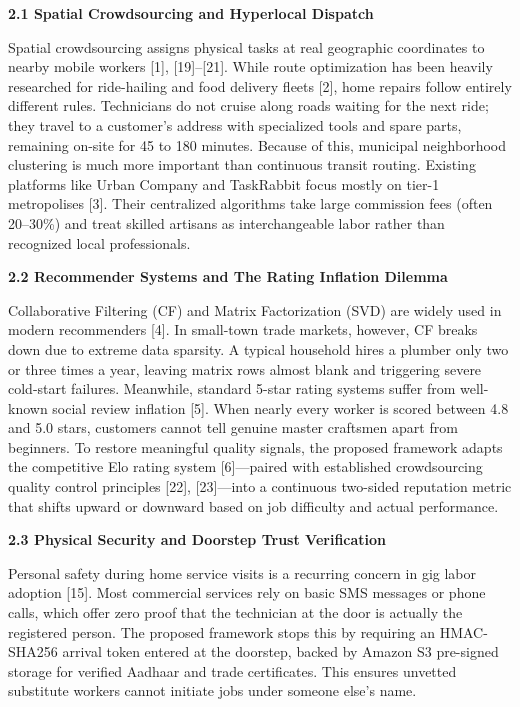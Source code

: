 \documentclass[10pt,twocolumn,a4paper]{article}
\begin{document}
\vspace{0.5em}
\noindent
\textbf{2.1 Spatial Crowdsourcing and Hyperlocal Dispatch}

Spatial crowdsourcing assigns physical tasks at real geographic coordinates to nearby mobile workers [1], [19]--[21]. While route optimization has been heavily researched for ride-hailing and food delivery fleets [2], home repairs follow entirely different rules. Technicians do not cruise along roads waiting for the next ride; they travel to a customer's address with specialized tools and spare parts, remaining on-site for 45 to 180 minutes. Because of this, municipal neighborhood clustering is much more important than continuous transit routing. Existing platforms like Urban Company and TaskRabbit focus mostly on tier-1 metropolises [3]. Their centralized algorithms take large commission fees (often 20--30\%) and treat skilled artisans as interchangeable labor rather than recognized local professionals.

\vspace{0.8em}
\noindent
\textbf{2.2 Recommender Systems and The Rating Inflation Dilemma}

Collaborative Filtering (CF) and Matrix Factorization (SVD) are widely used in modern recommenders [4]. In small-town trade markets, however, CF breaks down due to extreme data sparsity. A typical household hires a plumber only two or three times a year, leaving matrix rows almost blank and triggering severe cold-start failures. Meanwhile, standard 5-star rating systems suffer from well-known social review inflation [5]. When nearly every worker is scored between 4.8 and 5.0 stars, customers cannot tell genuine master craftsmen apart from beginners. To restore meaningful quality signals, the proposed framework adapts the competitive Elo rating system [6]---paired with established crowdsourcing quality control principles [22], [23]---into a continuous two-sided reputation metric that shifts upward or downward based on job difficulty and actual performance.

\vspace{0.8em}
\noindent
\textbf{2.3 Physical Security and Doorstep Trust Verification}

Personal safety during home service visits is a recurring concern in gig labor adoption [15]. Most commercial services rely on basic SMS messages or phone calls, which offer zero proof that the technician at the door is actually the registered person. The proposed framework stops this by requiring an HMAC-SHA256 arrival token entered at the doorstep, backed by Amazon S3 pre-signed storage for verified Aadhaar and trade certificates. This ensures unvetted substitute workers cannot initiate jobs under someone else's name.
\end{document}
